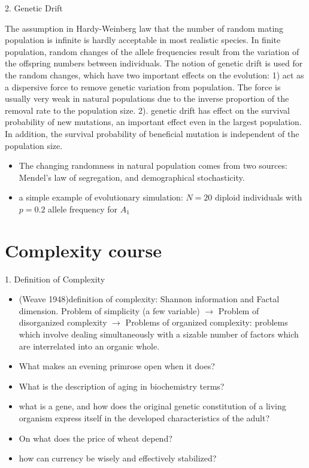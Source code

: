 \documentclass[paper=a4, fontsize=12pt]{scrartcl}	%
\numberwithin{equation}{section}					%
\numberwithin{figure}{section}					%
\numberwithin{table}{section}					%
\begin{document}
2. Genetic Drift

The assumption in Hardy-Weinberg law that the number of random mating population is infinite is hardly acceptable in most realistic species. In finite population, random changes of the allele frequencies result from the variation of the offspring numbers between individuals. The notion of genetic drift is used for the random changes, which have two important effects on the evolution: 1) act as a dispersive force to remove genetic variation from population. The force is usually very weak in natural populations due to the inverse proportion of the removal rate to the population size. 2). genetic drift has effect on the survival probability of new mutations, an important effect even in the largest population. In addition, the survival probability of beneficial mutation is independent of the population size. 

\begin{itemize}
\item The changing randomness in natural population comes from two sources: Mendel's law of segregation, and demographical stochasticity.
\item a simple example of evolutionary simulation: $N=20$ diploid individuals with $p=0.2$ allele frequency for $A_1$
\end{itemize}

\section{Complexity course}
1. Definition of Complexity
\begin{itemize}
\item (Weave 1948)definition of complexity: Shannon information and Factal dimension. Problem of simplicity (a few variable) $\rightarrow$ Problem of disorganized complexity $\rightarrow$ Problems of organized complexity: problems which involve dealing simultaneously with a sizable number of factors which are interrelated into an organic whole. 
\item What makes an evening primrose open when it does?
\item What is the description of aging in biochemistry terms?
\item what is a gene, and how does the original genetic constitution of a living organism express itself in the developed characteristics of the adult?
\item On what does the price of wheat depend?
\item how can currency be wisely and effectively stabilized?
\end{itemize}
\end{document}
